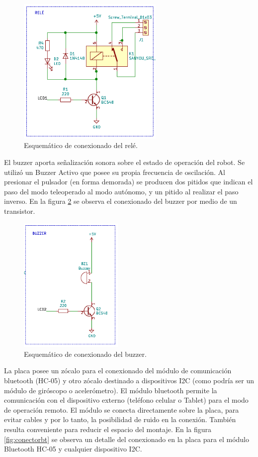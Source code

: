 \begin{figure}[h]
	\centering
	\includegraphics[width=7cm]{./Figures/rele.PNG}
	\caption{Esquemático de conexionado del relé.}
	\label{fig:rele}
\end{figure}


El buzzer aporta señalización sonora sobre el estado de operación del robot. Se utilizó un Buzzer Activo que  posee su propia
frecuencia de oscilación. Al presionar el pulsador (en forma demorada) se producen dos pitidos que indican el paso del modo teleoperado al modo autónomo, y un pitido al realizar el paso inverso. En la figura \ref{fig:buzzer} se observa el conexionado del buzzer por medio de un transistor.

\begin{figure}[h]
	\centering
	\includegraphics[width=5cm]{./Figures/buzzer.PNG}
	\caption{Esquemático de conexionado del buzzer.}
	\label{fig:buzzer}
\end{figure}

La placa posee un zócalo para el conexionado del módulo  de comunicación bluetooth (HC-05) y otro zócalo destinado a dispositivos I2C (como podría ser un módulo de giróscopo o acelerómetro). El módulo bluetooth permite la comunicación con el dispositivo externo (teléfono celular o Tablet) para el modo de operación remoto. El módulo se conecta directamente sobre la placa, para evitar cables y por lo tanto, la posibilidad de ruido en la conexión. También resulta conveniente para reducir el espacio del montaje. 
En la figura \ref{fig:conectorbt} se observa un detalle del conexionado en la placa para el módulo Bluetooth HC-05 y cualquier dispositivo I2C.


